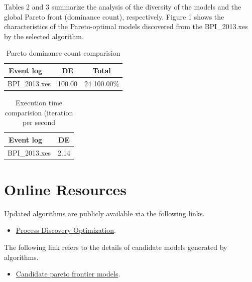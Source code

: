 \documentclass{article}
\begin{document}
Tables 2 and 3 summarize the analysis of the diversity of the models and the global Pareto front (dominance count), respectively. Figure 1 shows the characteristics of the Pareto-optimal models discovered from the
BPI\_2013.xes by the selected algorithm.
\begin{table}[htbp]
\vspace{-1mm}
\caption{Pareto dominance count comparision}\label{tbl:2}
\centering %
\setlength{\tabcolsep}{1pt} %
\fontsize{7}{9}\selectfont
\begin{tabular}{|l|c|c|}
\hline %
\,Event log &DE&Total\\
\hline %
BPI\_2013.xes&100.00&24 100.00\%\\
\hline %
\end{tabular}
\vspace{-3.75mm}
\end{table}

\begin{table}[htbp]
\vspace{-1mm}
\caption{Execution time comparision (iteration per second}\label{tbl:4}
\centering %
\setlength{\tabcolsep}{1pt} %
\fontsize{7}{9}\selectfont
\begin{tabular}{|l|c|
}
\hline %
\,Event log &DE\\
\hline %
BPI\_2013.xes&2.14\\
\hline %
\end{tabular}
\vspace{-3.75mm}
\end{table}

\section{Online Resources}
Updated algorithms are publicly available via the following links.
\begin{itemize}
\item
\href{https://github.com/HzhianUnimelb/BPM_ProcessDiscovery_Optimization}{Process Discovery Optimization}.
\end{itemize}
The following link refers to the details of candidate models generated by algorithms.
\begin{itemize}
\item
\href{C:/Users/hzhian/eclipse-workspace/processICPM/20250730_152959}{Candidate pareto frontier models}.
\end{itemize}
\end{document}
